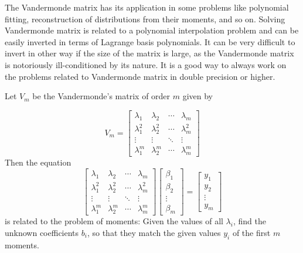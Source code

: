 The Vandermonde matrix has its application in some problems like polynomial
fitting, reconstruction of distributions from their moments, and so
on. Solving Vandermonde matrix is related to a polynomial interpolation
problem and can be easily inverted in terms of Lagrange basis polynomials.
It can be very difficult to invert in other way if the size of the
matrix is large, as the Vandermonde matrix is notoriously ill-conditioned
by its nature. It is a good way to always work on the problems related
to Vandermonde matrix in double precision or higher. 

Let $V_{m}$ be the Vandermonde's matrix of order $m$ given by 

\begin{equation}
V_{m}=\left[\begin{array}{cccc}
\lambda_{1} & \lambda_{2} & \cdots & \lambda_{m}\\
\lambda_{1}^{2} & \lambda_{2}^{2} & \cdots & \lambda_{m}^{2}\\
\vdots & \vdots & \ddots & \vdots\\
\lambda_{1}^{m} & \lambda_{2}^{m} & \cdots & \lambda_{m}^{m}
\end{array}\right]\label{eq:Vander Matrix}
\end{equation}
Then the equation 
\begin{equation}
\left[\begin{array}{cccc}
\lambda_{1} & \lambda_{2} & \cdots & \lambda_{m}\\
\lambda_{1}^{2} & \lambda_{2}^{2} & \cdots & \lambda_{m}^{2}\\
\vdots & \vdots & \ddots & \vdots\\
\lambda_{1}^{m} & \lambda_{2}^{m} & \cdots & \lambda_{m}^{m}
\end{array}\right]\left[\begin{array}{c}
\beta_{1}\\
\beta_{2}\\
\vdots\\
\beta_{m}
\end{array}\right]=\left[\begin{array}{c}
y_{1}\\
y_{2}\\
\vdots\\
y_{m}
\end{array}\right]\label{eq:Vander Eq.}
\end{equation}
is related to the problem of moments: Given the values of all $\lambda_{i}$,
find the unknown coefficients $b_{i}$, so that they match the given
values $y_{i}$ of the first $m$ moments. 

